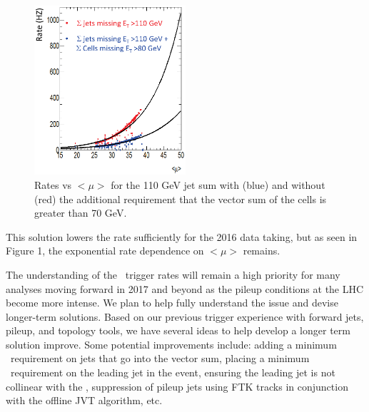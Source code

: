 \begin{figure}[htb]
\centering
\includegraphics[width=0.50\textwidth]{images/met-growth-labc.eps}
\caption[]{Rates vs $<\mu>$ for the 110 GeV jet sum with (blue) and without (red) the additional requirement that the vector sum of the cells is greater than 70 GeV.}
\label{fig:mettrigger}
\end{figure}  


This solution lowers the rate sufficiently for the 2016 data taking, but as seen in Figure 1, the exponential rate dependence on  $<\mu>$ remains.  

The understanding of the \met\ trigger rates will remain a high priority for many analyses moving forward in 2017 and beyond as the pileup conditions at the LHC become more intense.  We plan to help fully understand the issue and devise longer-term solutions.  Based on our previous trigger experience with forward jets, pileup, and topology tools, we have several ideas to help develop a longer term solution improve. Some potential improvements include:   adding a minimum \pt\ requirement on jets that go into the vector sum, placing a minimum \pt\ requirement on the leading jet in the event, ensuring the leading jet is not collinear with the \met, suppression of pileup jets using FTK tracks in conjunction with the offline JVT algorithm, etc. 
